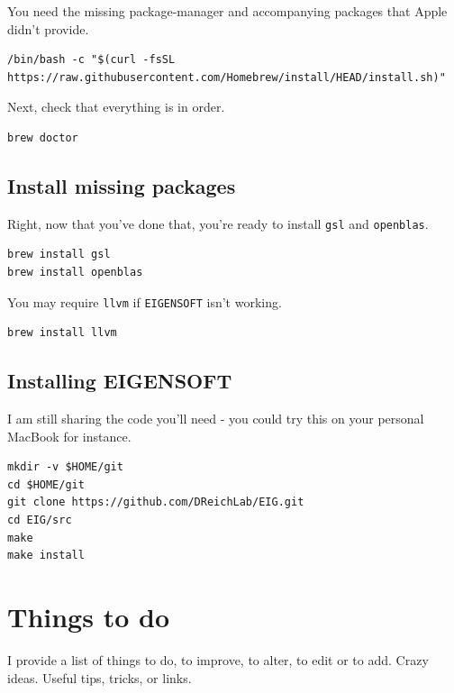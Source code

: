 \documentclass[
]{book}
\begin{document}
You need the missing package-manager and accompanying packages that Apple didn't provide.

\begin{verbatim}
/bin/bash -c "$(curl -fsSL https://raw.githubusercontent.com/Homebrew/install/HEAD/install.sh)"
\end{verbatim}

Next, check that everything is in order.

\begin{verbatim}
brew doctor
\end{verbatim}

\hypertarget{install-missing-packages}{%
\section{Install missing packages}\label{install-missing-packages}}

Right, now that you've done that, you're ready to install \texttt{gsl} and \texttt{openblas}.

\begin{verbatim}
brew install gsl
brew install openblas
\end{verbatim}

You may require \texttt{llvm} if \texttt{EIGENSOFT} isn't working.

\begin{verbatim}
brew install llvm
\end{verbatim}

\hypertarget{installing-eigensoft}{%
\section{Installing EIGENSOFT}\label{installing-eigensoft}}

I am still sharing the code you'll need - you could try this on your personal MacBook for instance.

\begin{verbatim}
mkdir -v $HOME/git
cd $HOME/git
git clone https://github.com/DReichLab/EIG.git
cd EIG/src
make
make install
\end{verbatim}

\hypertarget{todo}{%
\chapter{Things to do}\label{todo}}

I provide a list of things to do, to improve, to alter, to edit or to add. Crazy ideas. Useful tips, tricks, or links.
\end{document}
